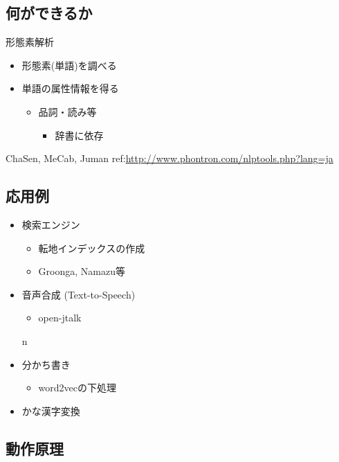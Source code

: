 \documentclass[mingoth,a4paper]{jsarticle}
\begin{document}
\subsection{何ができるか}
形態素解析
\begin{itemize}
\item 形態素(単語)を調べる
\item 単語の属性情報を得る
  \begin{itemize}
  \item 品詞・読み等
    \begin{itemize}
    \item 辞書に依存
    \end{itemize}
  \end{itemize}    
\end{itemize}

 ChaSen, MeCab, Juman
 ref:\url{http://www.phontron.com/nlptools.php?lang=ja}

\subsection{応用例}
\begin{itemize}
\item 検索エンジン
  \begin{itemize}
  \item 転地インデックスの作成
  \item Groonga, Namazu等
  \end{itemize}
\item 音声合成 (Text-to-Speech)
  \begin{itemize}
  \item open-jtalk
  \end{itemize}n
\item 分かち書き
  \begin{itemize}
  \item word2vecの下処理
  \end{itemize}
\item かな漢字変換
\end{itemize}

\subsection{動作原理}
\end{document}

